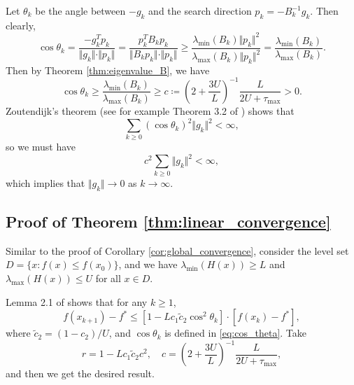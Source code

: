 \documentclass{article}
\theoremstyle{plain}
\theoremstyle{definition}
\theoremstyle{remark}
\begin{document}
Let $\theta_k$ be the angle between $-g_k$ and the search direction $p_k=-B_k^{-1}g_k$. Then clearly,
\begin{equation}
\label{eq:cos_theta}
\cos \theta_k=\frac{-g_k^T p_k}{\Vert g_k \Vert \cdot \Vert p_k\Vert}=\frac{p_k^T B_k p_k}{\Vert B_k p_k \Vert \cdot \Vert p_k\Vert} \ge \frac{\lambda_{\min}(B_k)\Vert p_k\Vert^2}{\lambda_{\max}(B_k)\Vert p_k\Vert^2}=\frac{\lambda_{\min}(B_k)}{\lambda_{\max}(B_k)}.
\end{equation}
Then by Theorem \ref{thm:eigenvalue_B}, we have
\[
\cos \theta_k \ge \frac{\lambda_{\min}(B_k)}{\lambda_{\max}(B_k)}\ge c\coloneqq \left(2+\frac{3U}{L}\right)^{-1}\frac{L}{2U+\tau_{\max}}>0.
\]
Zoutendijk's theorem (see for example Theorem 3.2 of \citealp{nocedal2006numerical}) shows that
\[
\sum_{k\ge 0} (\cos\theta_k)^2 \Vert g_k \Vert^2 < \infty,
\]
so we must have
\[
c^2\sum_{k\ge 0} \Vert g_k \Vert^2 < \infty,
\]
which implies that $\Vert g_k \Vert\rightarrow 0$ as $k\rightarrow\infty$.

\subsection{Proof of Theorem \ref{thm:linear_convergence}}
Similar to the proof of Corollary \ref{cor:global_convergence}, consider the level set $D=\{x:f(x)\le f(x_0)\}$, and we have $\lambda_{\min}(H(x))\ge L$ and $\lambda_{\max}(H(x))\le U$ for all $x\in D$.

Lemma 2.1 of \citet{byrd1987global} shows that for any $k\ge 1$,
\[
f(x_{k+1})-f^*\le [1-L c_1 \tilde{c}_2\cos^2\theta_k]\cdot [f(x_k)-f^*],
\]
where $\tilde{c}_2=(1-c_2)/U$, and $\cos\theta_k$ is defined in \eqref{eq:cos_theta}. Take
\[
r=1-Lc_1\tilde{c}_2c^2,\quad c= \left(2+\frac{3U}{L}\right)^{-1}\frac{L}{2U+\tau_{\max}},
\]
and then we get the desired result.
\end{document}
